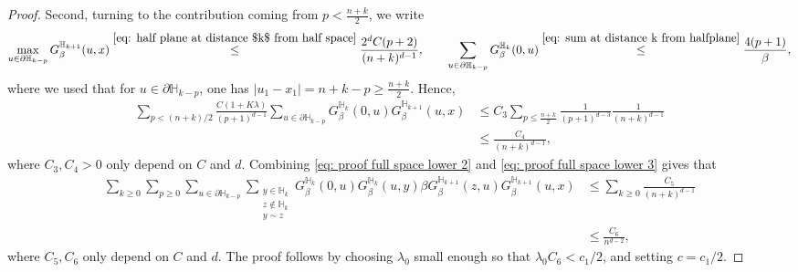 \documentclass[10pt,a4paper]{amsart}
\begin{document}
\begin{proof}
Second, turning to the contribution coming from $p< \tfrac{n+k}{2}$, we write
\begin{equation}
	\max_{u\in \partial \mathbb H_{k-p}}G_\beta^{\mathbb H_{k+1}}(u,x)\stackrel{\eqref{eq: half plane at distance $k$ from half space}}\leq \frac{2^dC(p+2)}{(n+k)^{d-1}}, \qquad \sum_{u\in \partial \mathbb H_{k-p}}G_\beta^{\mathbb H_{k}}(0,u)\stackrel{\eqref{eq: sum at distance k from halfplane}}\leq \frac{4(p+1)}{\beta},
\end{equation}
where we used that for $u\in \partial \mathbb H_{k-p}$, one has $|u_1-x_1|=n+k-p\geq \tfrac{n+k}{2}$. Hence,
\begin{align}
	\sum_{p< (n+k)/2}\frac{C(1+K\lambda)}{(p+1)^{d-1}}\sum_{u\in \partial \mathbb H_{k-p}}G_\beta^{\mathbb H_k}(0,u)G_\beta^{\mathbb H_{k+1}}(u,x)&\leq C_3\sum_{p\leq\tfrac{n+k}{2}}\frac{1}{(p+1)^{d-3}}\frac{1}{(n+k)^{d-1}}
	\\&\leq \frac{C_4}{(n+k)^{d-1}},\label{eq: proof full space lower 3}
\end{align}
where $C_3,C_4>0$ only depend on $C$ and $d$. Combining \eqref{eq: proof full space lower 2} and \eqref{eq: proof full space lower 3} gives that
\begin{align}
	\sum_{k\geq 0}\sum_{p\geq 0}\sum_{u\in \partial \mathbb H_{k-p}}\sum_{\substack{y\in \mathbb H_k\\z\notin \mathbb H_k\\y\sim z}} G_\beta^{\mathbb H_k}(0,u)G_\beta^{\mathbb H_k}(u,y)\beta G_\beta^{\mathbb H_{k+1}}(z,u)G_\beta^{\mathbb H_{k+1}}(u,x)&\leq \sum_{k\geq 0}\frac{C_5}{(n+k)^{d-1}}\nonumber\\
	&\leq \frac{C_6}{n^{d-2}},
\end{align}
where $C_5,C_6$ only depend on $C$ and $d$. The proof follows by choosing $\lambda_0$ small enough so that $\lambda_0C_6<c_1/2$, and setting $c=c_1/2$.
%
%
\end{proof}
\end{document}
